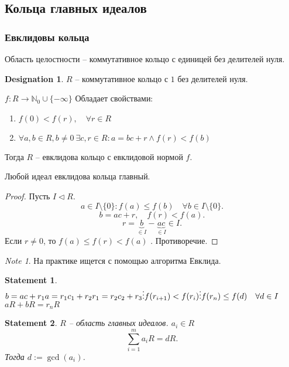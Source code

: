 \documentclass[11pt]{book}
\newcommand{\N}{\mathbb{N}}
\newcommand{\slim}{\sum\limits}
\theoremstyle{definition}
\theoremstyle{plain}
\theoremstyle{plain}
\newtheorem*{st}{Statement}
\theoremstyle{definition}
\newtheorem*{name}{Designation}
\theoremstyle{remark}
\newtheorem*{note}{Note}
\begin{document}
\subsection{Кольца главных идеалов}
\subsubsection{Евклидовы кольца}
\begin{defn}
 	Область целостности -- коммутативное кольцо с единицей без делителей нуля.   
\end{defn}
\begin{name}
    $ R$ -- коммутативное кольцо с $ 1$ без делителей нуля.
\end{name}
\begin{defn}
    $ f: R \to  \N_0 \cup \{-\infty\}$ 
    Обладает свойствами:
    \begin{enumerate}
	\item $ f(0) < f(r), \quad \forall  r \in  R$
	\item $ \forall a, b \in  R, b\ne 0 ~ \exists  c, r \in R: a = b c + r \wedge f(r) < f(b)$
    \end{enumerate}
    Тогда $ R$ -- евклидова кольцо с евклидовой нормой  $ f$.
\end{defn}
\begin{thm}
    Любой идеал евклидова кольца главный.
\end{thm}
\begin{proof}
    Пусть $ I \triangleleft  R$. 
    \[
	a \in  I \setminus \{0\}: f(a) \le  f(b) \quad \forall  b \in  I \setminus \{0\}
    .\] 
    \[
	b = ac + r, \quad f(r) < f(a)
    .\] 
    \[
	r = \underbrace{b}_{\in I} - \underbrace{ac}_{ \in  I} \in  I 
    .\] 
    Если $r \ne 0$, то $ f(a) \le  f(r) < f(a)$ . Противоречие. 
\end{proof}
\begin{note}
    На практике ищется с помощью алгоритма Евклида.
\end{note}
\begin{st}
    $ b = ac + r_1 \\
    a = r_1 c_1 + r_2 \\
    r_1 = r_2 c_2 + r_3 \\
    \vdots\\
    f(r_{i+1}) < f(r_i)\\
    \vdots\\
    f(r_n)  \le f(d) \quad \forall  d \in  I$
    $ a R + b R = r_n R$
\end{st}
\begin{st}
    $ R$ -- область главных идеалов.
    $ a_i \in  R$
    \[
	\slim_{i=1}^{m} a_i R = d R
    .\] 
    Тогда $ d:= \gcd(a_i)$.
\end{st}
\end{document}
